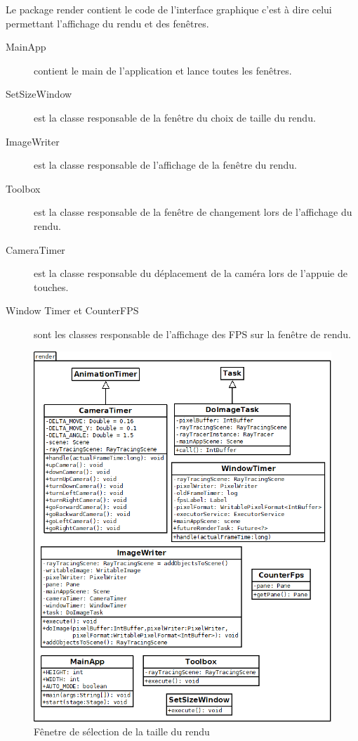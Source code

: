 Le package render contient le code de l'interface graphique c'est à dire celui permettant l'affichage du rendu et des fenêtres.

\begin{description}
    \item [MainApp] contient le main de l'application et lance toutes les fenêtres.
    \item [SetSizeWindow] est la classe responsable de la fenêtre du choix de taille du rendu.
    \item [ImageWriter] est la classe responsable de l'affichage de la fenêtre du rendu.
    \item [Toolbox] est la classe responsable de la fenêtre de changement lors de l'affichage du rendu.
    \item [CameraTimer] est la classe responsable du déplacement de la caméra lors de l'appuie de touches.
    \item [Window Timer et CounterFPS] sont les classes responsable de l'affichage des FPS sur la fenêtre de rendu.
\end{description}



\begin{figure}[h]
   \caption{Fênetre de sélection de la taille du rendu}
   \begin{center}
       \includegraphics[scale=0.5]{img/render.javafx/diagClassRender.png}
   \end{center}
\end{figure}
